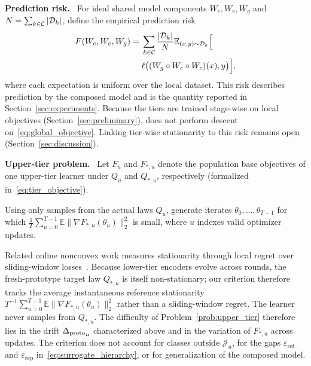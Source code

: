 \noindent\textbf{Prediction risk.}~
For ideal shared model components $W_c,W_e,W_g$ and $N=\sum_{k\in\mathcal{C}}|\mathcal D_k|$, define the empirical prediction risk
\begin{equation}
\begin{split}
 F(W_c,W_e,W_g)
 ={}&\sum_{k\in\mathcal{C}}\frac{|\mathcal D_k|}{N}
 \mathbb E_{(x,y)\sim\mathcal D_k}\Bigl[\\
 &\ell\bigl((W_g\circ W_e\circ W_c)(x),y\bigr)\Bigr],
\end{split}
 \label{eq:global_objective}
\end{equation}
where each expectation is uniform over the local dataset. This risk describes prediction by the composed model and is the quantity reported in Section~\ref{sec:experiments}. Because the tiers are trained stage-wise on local objectives (Section~\ref{sec:preliminary}), \ehsfp{} does not perform descent on~\eqref{eq:global_objective}. Linking tier-wise stationarity to this risk remains open (Section~\ref{sec:discussion}).

\noindent\textbf{Upper-tier problem.}~
Let $F_u$ and $F_{*,u}$ denote the population base objectives of one upper-tier learner under $Q_u$ and $Q_{*,u}$, respectively (formalized in~\eqref{eq:tier_objective}).
\begin{problem}
\label{prob:upper_tier}
Using only samples from the actual laws $Q_u$, generate iterates $\theta_0,\ldots,\theta_{T-1}$ for which
$\frac1T\sum_{u=0}^{T-1}\mathbb E\|\nabla F_{*,u}(\theta_u)\|_2^2$
is small, where $u$ indexes valid optimizer updates.
\end{problem}

Related online nonconvex work measures stationarity through local regret over sliding-window losses~\cite{hazan2017efficient}. Because lower-tier encoders evolve across rounds, the fresh-prototype target law $Q_{*,u}$ is itself non-stationary; our criterion therefore tracks the average instantaneous reference stationarity $T^{-1}\sum_{u=0}^{T-1}\mathbb E\|\nabla F_{*,u}(\theta_u)\|_2^2$ rather than a sliding-window regret. The learner never samples from $Q_{*,u}$. The difficulty of Problem~\ref{prob:upper_tier} therefore lies in the drift ${\Delta_{\mathrm{proto}}}_u$ characterized above and in the variation of $F_{*,u}$ across updates. The criterion does not account for classes outside $\mathcal J_u$, for the gaps $\varepsilon_{\mathrm{ref}}$ and $\varepsilon_{\mathrm{rep}}$ in~\eqref{eq:surrogate_hierarchy}, or for generalization of the composed model.